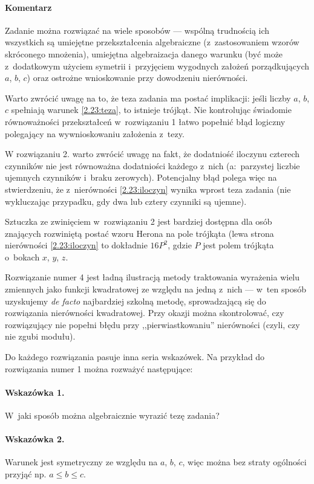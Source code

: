 \paragraph{Komentarz} Zadanie można rozwiązać na wiele sposobów --- wspólną trudnością ich wszystkich są umiejętne przekształcenia algebraiczne (z~zastosowaniem wzorów skróconego mnożenia), umiejętna algebraizacja danego warunku (być może z~dodatkowym użyciem symetrii i~przyjęciem wygodnych założeń porządkujących $a$, $b$, $c$) oraz ostrożne wnioskowanie przy dowodzeniu nierówności. 

Warto zwrócić uwagę na to, że teza zadania ma postać implikacji: jeśli liczby $a$, $b$, $c$ spełniają warunek \eqref{2.23:teza}, to istnieje trójkąt. Nie kontrolując świadomie równoważności przekształceń w~rozwiązaniu 1 łatwo popełnić błąd logiczny polegający na wywnioskowaniu założenia z~tezy.

W rozwiązaniu 2. warto zwrócić uwagę na fakt, że dodatniość iloczynu czterech czynników nie jest równoważna dodatniości każdego z~nich (a:~parzystej liczbie ujemnych czynników i~braku zerowych). Potencjalny błąd polega więc na stwierdzeniu, że z~nierówności \eqref{2.23:iloczyn} wynika wprost teza zadania (nie wykluczając przypadku, gdy dwa lub cztery czynniki są ujemne).

Sztuczka ze zwinięciem w~rozwiązaniu 2 jest bardziej dostępna dla osób znających rozwiniętą postać wzoru Herona na pole trójkąta (lewa strona nierówności \eqref{2.23:iloczyn} to dokładnie $16P^2$, gdzie $P$ jest polem trójkąta o~bokach $x$, $y$, $z$.

Rozwiązanie numer 4 jest ładną ilustracją metody traktowania wyrażenia wielu zmiennych jako funkcji kwadratowej ze względu na jedną z~nich --- w~ten sposób uzyskujemy \emph{de facto} najbardziej szkolną metodę, sprowadzającą się do rozwiązania nierówności kwadratowej. Przy okazji można skontrolować, czy rozwiązujący nie popełni błędu przy ,,pierwiastkowaniu'' nierówności (czyli, czy nie zgubi modułu).

Do każdego rozwiązania pasuje inna seria wskazówek. Na przykład do rozwiązania numer 1 można rozważyć następujące:

\paragraph{Wskazówka 1.} W~jaki sposób można algebraicznie wyrazić tezę zadania?

\paragraph{Wskazówka 2.} Warunek jest symetryczny ze względu na $a$, $b$, $c$, więc można bez straty ogólności przyjąć np. $a\leq b\leq c$.

